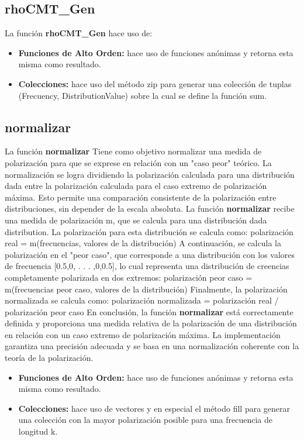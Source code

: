 \documentclass{article}
\begin{document}
    \subsection{rhoCMT\_Gen}
        La función \textbf{rhoCMT\_Gen} hace uso de:

    \begin{itemize}
      \item \textbf{Funciones de Alto Orden:} hace uso de funciones anónimas y retorna esta misma como resultado.
      \item \textbf{Colecciones:} hace uso del método zip para generar una colección de tuplas (Frecuency, DistributionValue) sobre la cual se define la función sum.
    \end{itemize}

    \subsection{normalizar}
    La función \textbf{normalizar} Tiene como objetivo normalizar una medida de polarización para que se exprese en relación con un "caso peor" teórico. La normalización se logra dividiendo la polarización calculada para una distribución dada entre la polarización calculada para el caso extremo de polarización máxima. Esto permite una comparación consistente de la polarización entre distribuciones, sin depender de la escala absoluta.
    La función \textbf{normalizar} recibe una medida de polarización m, que se calcula para una distribución dada distribution. La polarización para esta distribución se calcula como: polarización real = m(frecuencias, valores de la distribución)
    A continuación, se calcula la polarización en el "peor caso", que corresponde a una distribución con los valores de frecuencia [0.5,0, . . . ,0,0.5], lo cual representa una distribución de creencias completamente polarizada en dos extremos: polarización peor caso = m(frecuencias peor caso, valores de la distribución)
    Finalmente, la polarización normalizada se calcula como: polarización normalizada = polarización real / polarización peor caso
    En conclusión, la función \textbf{normalizar} está correctamente definida y proporciona una medida relativa de la polarización de una distribución en relación con un caso extremo de polarización máxima. La implementación garantiza una precisión adecuada y se basa en una normalización coherente con la teoría de la polarización.

    \begin{itemize}
      \item \textbf{Funciones de Alto Orden:} hace uso de funciones anónimas y retorna esta misma como resultado.
      \item \textbf{Colecciones:} hace uso de vectores y en especial el método fill para generar una colección con la mayor polarización posible para una frecuencia de longitud k.
    \end{itemize}
\end{document}
